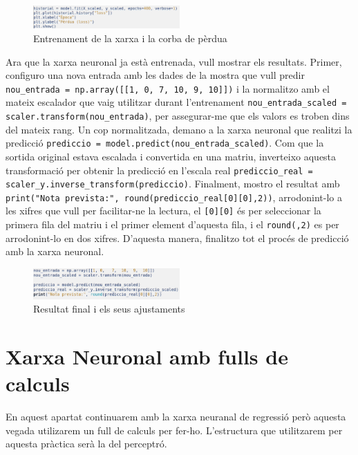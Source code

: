 \begin{figure}[H]
    \centering
    \includegraphics[width=0.5\textwidth]{./figures/28.png}
    \caption{Entrenament de la xarxa i la corba de pèrdua}
\end{figure}

Ara que la xarxa neuronal ja està entrenada, vull mostrar els resultats. Primer, configuro una nova entrada amb les dades de la mostra que vull predir \texttt{nou\_entrada = np.array([[1, 0,   7,  10,  9,  10]])} i la normalitzo amb el mateix escalador que vaig utilitzar durant l’entrenament \texttt{nou\_entrada\_scaled = scaler.transform(nou\_entrada)}, per assegurar-me que els valors es troben dins del mateix rang. Un cop normalitzada, demano a la xarxa neuronal que realitzi la predicció \texttt{prediccio = model.predict(nou\_entrada\_scaled)}. Com que la sortida original estava escalada i convertida en una matriu, inverteixo aquesta transformació per obtenir la predicció en l’escala real \texttt{prediccio\_real = scaler\_y.inverse\_transform(prediccio)}. Finalment, mostro el resultat amb \texttt{print("Nota prevista:", round(prediccio\_real[0][0],2))}, arrodonint-lo a les xifres que vull per facilitar-ne la lectura, el \texttt{[0][0]} és per seleccionar la primera fila del matriu i el primer element d'aquesta fila, i el \texttt{round(,2)} es per arrodonint-lo en dos xifres. D’aquesta manera, finalitzo tot el procés de predicció amb la xarxa neuronal.


\begin{figure}[H]
    \centering
    \includegraphics[width=0.5\textwidth]{./figures/29.png}
    \caption{Resultat final i els seus ajustaments}
\end{figure}




\section{Xarxa Neuronal amb fulls de calculs}\label{sec:11}
En aquest apartat continuarem amb la xarxa neuranal de regressió però aquesta vegada utilizarem un full de calculs per fer-ho.
 L'estructura que utilitzarem per aquesta pràctica serà la del perceptró.


